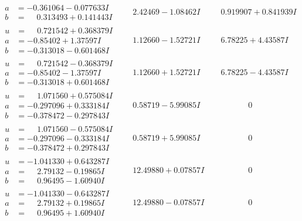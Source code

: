 \documentclass[1p]{elsarticle_modified}
\theoremstyle{definition}
\begin{document}
$$\begin{array}{c|c|c}
\begin{aligned}
a &= -0.361064 - 0.077633 I \\
b &= \phantom{-}0.313493 + 0.141443 I\end{aligned}
 & \phantom{-}2.42469 - 1.08462 I & \phantom{-}0.919907 + 0.841939 I \\ \hline\begin{aligned}
u &= \phantom{-}0.721542 + 0.368379 I \\
a &= -0.85402 + 1.37597 I \\
b &= -0.313018 - 0.601468 I\end{aligned}
 & \phantom{-}1.12660 - 1.52721 I & \phantom{-}6.78225 + 4.43587 I \\ \hline\begin{aligned}
u &= \phantom{-}0.721542 - 0.368379 I \\
a &= -0.85402 - 1.37597 I \\
b &= -0.313018 + 0.601468 I\end{aligned}
 & \phantom{-}1.12660 + 1.52721 I & \phantom{-}6.78225 - 4.43587 I \\ \hline\begin{aligned}
u &= \phantom{-}1.071560 + 0.575084 I \\
a &= -0.297096 + 0.333184 I \\
b &= -0.378472 - 0.297843 I\end{aligned}
 & \phantom{-}0.58719 - 5.99085 I & \phantom{-0.000000 } 0 \\ \hline\begin{aligned}
u &= \phantom{-}1.071560 - 0.575084 I \\
a &= -0.297096 - 0.333184 I \\
b &= -0.378472 + 0.297843 I\end{aligned}
 & \phantom{-}0.58719 + 5.99085 I & \phantom{-0.000000 } 0 \\ \hline\begin{aligned}
u &= -1.041330 + 0.643287 I \\
a &= \phantom{-}2.79132 - 0.19865 I \\
b &= \phantom{-}0.96495 - 1.60940 I\end{aligned}
 & \phantom{-}12.49880 + 0.07857 I & \phantom{-0.000000 } 0 \\ \hline\begin{aligned}
u &= -1.041330 - 0.643287 I \\
a &= \phantom{-}2.79132 + 0.19865 I \\
b &= \phantom{-}0.96495 + 1.60940 I\end{aligned}
 & \phantom{-}12.49880 - 0.07857 I & \phantom{-0.000000 } 0 \\ \hline\begin{aligned}

\end{aligned}
\end{array}$$
\end{document}
